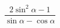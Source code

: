 \begin{ex}[type=expression]
	\begin{condition}
		\( \dfrac{2\sin^2\alpha-1}{\sin\alpha-\cos\alpha} \)
	\end{condition}
\end{ex}
